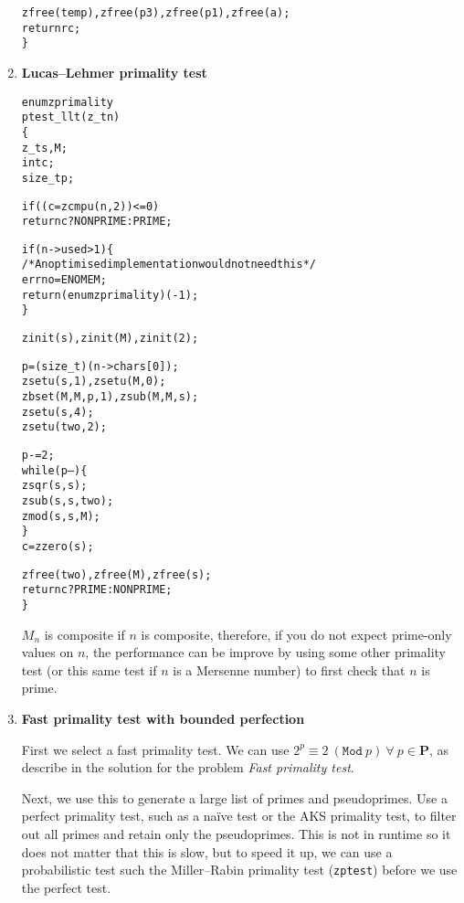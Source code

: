 \begin{enumerate}[label=\textbf{\arabic*}.]
\begin{alltt}
    zfree(temp), zfree(p3), zfree(p1), zfree(a);
    return rc;
\}
\end{alltt}
\vspace{-1em}



\item \textbf{Lucas–Lehmer primality test}

\vspace{-1em}
\begin{alltt}
enum zprimality
ptest_llt(z_t n)
\{
    z_t s, M;
    int c;
    size_t p;

    if ((c = zcmpu(n, 2)) <= 0)
        return c ? NONPRIME : PRIME;

    if (n->used > 1) \{
        \textcolor{c}{/* \textrm{An optimised implementation would not need this} */}
        errno = ENOMEM;
        return (enum zprimality)(-1);
    \}

    zinit(s), zinit(M), zinit(2);

    p = (size_t)(n->chars[0]);
    zsetu(s, 1), zsetu(M, 0);
    zbset(M, M, p, 1), zsub(M, M, s);
    zsetu(s, 4);
    zsetu(two, 2);

    p -= 2;
    while (p--) \{
        zsqr(s, s);
        zsub(s, s, two);
        zmod(s, s, M);
    \}
    c = zzero(s);

    zfree(two), zfree(M), zfree(s);
    return c ? PRIME : NONPRIME;
\}
\end{alltt}

$M_n$ is composite if $n$ is composite, therefore,
if you do not expect prime-only values on $n$, the
performance can be improve by using some other
primality test (or this same test if $n$ is a
Mersenne number) to first check that $n$ is prime.



\item \textbf{Fast primality test with bounded perfection}

First we select a fast primality test. We can use
$2^p \equiv 2 ~(\texttt{Mod}~ p) ~\forall~ p \in \textbf{P}$,
as describe in the solution for the problem
\textit{Fast primality test}.

Next, we use this to generate a large list of primes and
pseudoprimes. Use a perfect primality test, such as a
naïve test or the AKS primality test, to filter out all
primes and retain only the pseudoprimes. This is not in
runtime so it does not matter that this is slow, but to
speed it up, we can use a probabilistic test such the
Miller–Rabin primality test (\texttt{zptest}) before we
use the perfect test.


\end{enumerate}
